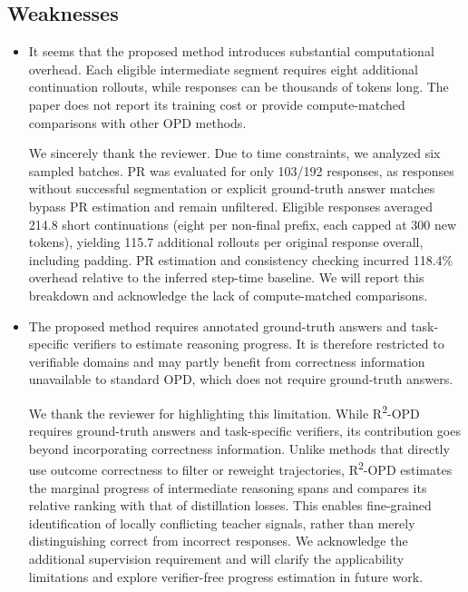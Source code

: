 \documentclass[11pt,a4paper]{article}
\begin{document}
\subsection*{Weaknesses}
\begin{itemize}
\item It seems that the proposed method introduces substantial computational overhead. Each eligible intermediate segment requires eight additional continuation rollouts, while responses can be thousands of tokens long. The paper does not report its training cost or provide compute-matched comparisons with other OPD methods.
\par{}
\begin{responsebox}[frametitle={Response to W1}]
We sincerely thank the reviewer. Due to time constraints, we analyzed six sampled batches. PR was evaluated for only 103/192 responses, as responses without successful segmentation or explicit ground-truth answer matches bypass PR estimation and remain unfiltered. Eligible responses averaged 214.8 short continuations (eight per non-final prefix, each capped at 300 new tokens), yielding 115.7 additional rollouts per original response overall, including padding. PR estimation and consistency checking incurred 118.4\% overhead relative to the inferred step-time baseline. We will report this breakdown and acknowledge the lack of compute-matched comparisons.
\end{responsebox}

\item The proposed method requires annotated ground-truth answers and task-specific verifiers to estimate reasoning progress. It is therefore restricted to verifiable domains and may partly benefit from correctness information unavailable to standard OPD, which does not require ground-truth answers.
\par{}
\begin{responsebox}[frametitle={Response to W2}]
We thank the reviewer for highlighting this limitation. While R\textsuperscript{2}-OPD requires ground-truth answers and task-specific verifiers, its contribution goes beyond incorporating correctness information. Unlike methods that directly use outcome correctness to filter or reweight trajectories, R\textsuperscript{2}-OPD estimates the marginal progress of intermediate reasoning spans and compares its relative ranking with that of distillation losses. This enables fine-grained identification of locally conflicting teacher signals, rather than merely distinguishing correct from incorrect responses. We acknowledge the additional supervision requirement and will clarify the applicability limitations and explore verifier-free progress estimation in future work.
\end{responsebox}


\end{itemize}
\end{document}
